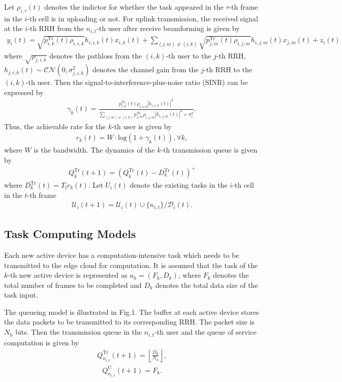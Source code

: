 \documentclass[journal, 12pt, onecolumn, draftclsnofoot]{IEEEtran}
\begin{document}
Let $\rho_{i,\tau}(t)$ denotes the indictor for whether the task appeared in the $\tau$-th frame in the $i$-th cell is in uploading or not.
For uplink transmission, the received signal at the $i$-th RRH from the $n_{i,t}$-th user after receive beamforming is given by
\begin{align}
	y_{i}(t) = \sqrt{p_{i,k}^{\mathrm{Tr}}(t)\rho_{i,i,k}}h_{i,i,k}(t)x_{i,k}(t)+\sum_{(j,m)\neq (i,k)}\sqrt{p_{j,m}^{\mathrm{Tr}}(t)\rho_{i,j,m}}h_{i,j,m}(t)x_{j,m}(t)+z_{i}(t)
\end{align}
where $\sqrt{\rho_{j,i,k}}$ denotes the pathloss from the $(i,k)$-th user to the $j$-th RRH, $h_{j,i,k}(t)\sim \mathcal{CN}(0,\sigma_{j,i,k}^{2})$ denotes the channel gain from the $j$-th RRH to the $(i,k)$-th user.
Then the signal-to-interference-plus-noise ratio (SINR) can be expressed by
\begin{align}
	\gamma_{k}(t)=\frac{p_{i,k}^{\mathrm{Tr}}(t)\rho_{i,i,k}|h_{i,i,k}(t)|^2}{\sum_{(j,m)\neq (i,k)}p_{j,m}^{\mathrm{Tr}}\rho_{i,j,m}|h_{i,j,m}(t)|^{2}+\sigma_{i}^{2}},
\end{align}
Thus, the achievable rate for the $k$-th user is given by
\begin{align}
	r_{k}(t)= W\cdot \text{log}(1+\gamma_{k}(t)), \forall k,
\end{align}
where $W$ is the bandwidth.
The dynamics of the $k$-th transmission queue is given by
\begin{align}
	Q_{k}^{\mathrm{Tr}}(t+1)=(Q_{k}^{\mathrm{Tr}}(t)-D_{k}^{\mathrm{Tr}}(t))^{+}
\end{align}
where $D_{k}^{\mathrm{Tr}}(t)=T_{\mathrm{f}}r_{k}(t)$.
Let ${U}_{i}(t)$ denote the existing tasks in the $i$-th cell in the $t$-th frame
\begin{align}
	\mathcal{U}_{i}(t+1)= \mathcal{U}_{i}(t)\cup\{n_{i,t}\}/\mathcal{D}_{i}(t).
\end{align}

\subsection{Task Computing Models}
Each new active device has a computation-intensive task which needs to be transmitted to the edge cloud for computation. It is assumed that the task of the $k$-th new active device is represented as $u_{k}=(F_{k},D_{k})$, where $F_{k}$ denotes the total number of frames to be completed and $D_{k}$ denotes the total data size of the task input.

The queueing model is illustrated in Fig.1.
The buffer at each active device stores the data packets to be transmitted to its corresponding RRH. The packet size is ${N_\mathrm{b}}$ bits. Then the transmission queue in the $n_{i,t}$-th user and the queue of service computation is given by
\begin{align}
	Q_{n_{i,t}}^{\mathrm{Tr}}(t+1)=\left\lfloor\frac{D_{k}}{N_\mathrm{b}}\right\rfloor,
\end{align}
\begin{align}
	Q_{n_{i,t}}^{\mathrm{C}}(t+1)=F_{k}.
\end{align}
\end{document}
